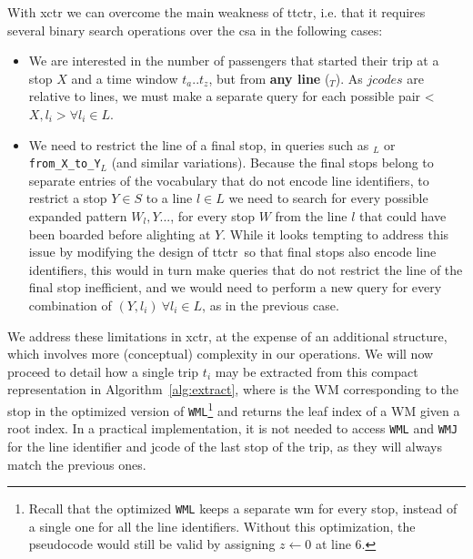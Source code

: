 	With \gls{xctr} we can overcome the main weakness of \gls{ttctr}, i.e. that it requires several binary search operations over the \gls{csa} in the following cases:
    \begin{itemize}
        \item We are interested in the number of passengers that started their trip at a stop $X$ and a time window $t_a..t_z$, but from \textbf{any line} (\texttt{\startX$_{T}$}). As $jcodes$ are relative to lines, we must make a separate query for each possible pair <$X, l_i> \forall l_i \in L$.
        \item We need to restrict the line of a final stop, in queries such as \texttt{\endX$_{L}$} or \texttt{from\_X\_to\_Y$_{L}$} (and similar variations). Because the final stops belong to separate entries of the vocabulary that do not encode line identifiers, to restrict a stop $Y\in S$ to a line $l\in L$ we need to search for every possible expanded pattern $W_l,Y...$, for every stop $W$ from the line $l$ that could have been boarded before alighting at $Y$. While it looks tempting to address this issue by modifying the design of \gls{ttctr}~so that final stops also encode line identifiers, this would in turn make queries that do not restrict the line of the final stop inefficient, and we would need to perform a new query for every combination of $(Y, l_i)~\forall l_i \in L$, as in the previous case.
    \end{itemize}
	
	We address these limitations in \gls{xctr}, at the expense of an additional structure, which involves more (conceptual) complexity in our operations. We will now proceed to detail how a single trip $t_i$ may be extracted from this compact representation
	in Algorithm~\ref{alg:extract}, where 
	 is the WM corresponding to the stop  in the optimized version of \texttt{WML}\footnote{Recall that the optimized \texttt{WML} keeps a separate \gls{wm} for every stop, instead of a single one for all the line identifiers. Without this optimization, the pseudocode would still be valid by assigning $z\leftarrow 0$ at line 6.} and  returns the leaf index of a WM given a root index. In a practical implementation, it is not needed to access \texttt{WML} and \texttt{WMJ} for the line identifier and jcode of the last stop of the trip, as they will always match the previous ones.
	
